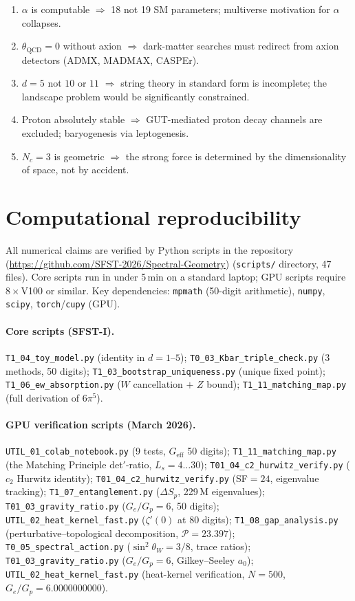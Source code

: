 \documentclass[11pt,a4paper]{article}
\begin{document}
\begin{enumerate}[leftmargin=1.5em,itemsep=0.2em]
\item $\alpha$ is computable $\Rightarrow$ 18 not 19 SM parameters; multiverse
  motivation for $\alpha$ collapses.
\item $\theta_{\mathrm{QCD}}=0$ without axion $\Rightarrow$ dark-matter
  searches must redirect from axion detectors (ADMX, MADMAX, CASPEr).
\item $d=5$ not $10$ or $11$ $\Rightarrow$ string theory in standard form
  is incomplete; the landscape problem would be significantly constrained.
\item Proton absolutely stable $\Rightarrow$ GUT-mediated proton decay channels are excluded;
  baryogenesis via leptogenesis.
\item $N_c=3$ is geometric $\Rightarrow$ the strong force is determined by
  the dimensionality of space, not by accident.
\end{enumerate}

\section*{Computational reproducibility}

All numerical claims are verified by Python scripts in the repository (\url{https://github.com/SFST-2026/Spectral-Geometry})
(\texttt{scripts/} directory, 47 files). Core scripts run in under 5\,min
on a standard laptop; GPU scripts require $8{\times}$V100 or similar.
Key dependencies: \texttt{mpmath} (50-digit arithmetic),
\texttt{numpy}, \texttt{scipy}, \texttt{torch}/\texttt{cupy} (GPU).

\paragraph{Core scripts (SFST-I).}
\texttt{T1\_04\_toy\_model.py} (identity in $d=1$--$5$);
\texttt{T0\_03\_Kbar\_triple\_check.py} (3 methods, 50 digits);
\texttt{T1\_03\_bootstrap\_uniqueness.py} (unique fixed point);
\texttt{T1\_06\_ew\_absorption.py} ($W$ cancellation $+$ $Z$ bound);
\texttt{T1\_11\_matching\_map.py} (full derivation of $6\pi^5$).

\paragraph{GPU verification scripts (March 2026).}
\texttt{UTIL\_01\_colab\_notebook.py} (9 tests, $G_{\mathrm{eff}}$ 50 digits);
\texttt{T1\_11\_matching\_map.py} (the Matching Principle det$'$-ratio, $L_s{=}4{\ldots}30$);
\texttt{T01\_04\_c2\_hurwitz\_verify.py} ($c_2$ Hurwitz identity);
\texttt{T01\_04\_c2\_hurwitz\_verify.py} (SF${=}24$, eigenvalue tracking);
\texttt{T1\_07\_entanglement.py} ($\Delta S_p$, 229\,M eigenvalues);
\texttt{T01\_03\_gravity\_ratio.py} ($G_e/G_p{=}6$, 50 digits);
\texttt{UTIL\_02\_heat\_kernel\_fast.py} ($\zeta'(0)$ at 80 digits);
\texttt{T1\_08\_gap\_analysis.py} (perturbative--topological decomposition, $\mathcal{P}=23.397$);
\texttt{T0\_05\_spectral\_action.py} ($\sin^2\theta_W=3/8$, trace ratios);
\texttt{T01\_03\_gravity\_ratio.py} ($G_e/G_p=6$, Gilkey--Seeley $a_0$);
\texttt{UTIL\_02\_heat\_kernel\_fast.py} (heat-kernel verification, $N=500$, $G_e/G_p=6.0000000000$).
\end{document}
